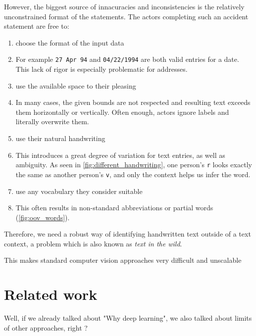 However, the biggest source of innacuracies and inconsistencies is the relatively unconstrained format of the statements. The actors completing such an accident statement are free to:
\begin{enumerate}
	\item choose the format of the input data
	\item[] For example \texttt{27 Apr 94} and \texttt{04/22/1994} are both valid entries for a date. This lack of rigor is especially problematic for addresses.

	\item use the available space to their pleasing
	\item[] In many cases, the given bounds are not respected and resulting text exceeds them horizontally or vertically. Often enough, actors ignore labels and literally overwrite them.

	\item{use their natural handwriting \label{itm:natural_handwriting}}
	\item[] This introduces a great degree of variation for text entries, as well as ambiguity. As seen in \cref{fig:different_handwriting}, one person's \texttt{r} looks exactly the same as another person's \texttt{v}, and only the context helps us infer the word.

	\item use any vocabulary they consider suitable
	\item[] This often results in non-standard abbreviations or partial words (\cref{fig:oov_words}).
\end{enumerate}


Therefore, we need a robust way of identifying handwritten text outside of a text context, a problem which is also known as \emph{text in the wild}.


This makes standard computer vision approaches very difficult and unscalable


\section{Related work}

Well, if we already talked about "Why deep learning", we also talked about limits of other approaches, right ?
